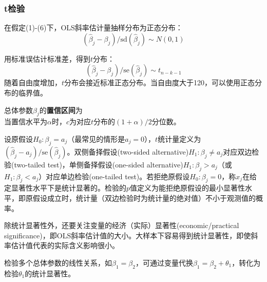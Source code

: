\subsubsection{t检验}
\par 在假定(1)-(6)下，OLS斜率估计量抽样分布为正态分布：
\begin{equation}
    (\hat{\beta}_j-\beta_j)/\text{sd}(\hat{\beta}_j) \sim N(0, 1)
\end{equation}
\par 用标准误估计标准差，得到$t$分布：
\begin{equation}
    (\hat{\beta}_j-\beta_j)/\text{se}(\hat{\beta}_j) \sim t_{n-k-1}
\end{equation}
随着自由度增加，$t$分布会接近标准正态分布。当自由度大于120，可以使用正态分布的临界值。

\par 总体参数$\beta_j$的\textbf{置信区间}为
\begin{equation}
    [\hat{\beta}_j-c\times \text{se}(\hat{\beta}_j),\hat{\beta}_j+c\times\text{se}(\hat{\beta}_j)]
\end{equation}
当置信水平为$\alpha$时，$c$为对应$t$分布的$(1+\alpha)/2$分位数。

\par 设原假设$H_0: \beta_j=a_j$（最常见的情形是$a_j=0$），$t$统计量定义为$(\hat{\beta}_j-a_j)/\text{se}(\hat{\beta}_j)$。双侧备择假设(two-sided alternative)$H_1: \beta_j\neq a_j$对应双边检验(two-tailed test)，单侧备择假设(one-sided alternative)$H_1: \beta_j > a_j$（或$H_1: \beta_j < a_j$）对应单边检验(one-tailed test)。若拒绝原假设$H_0: \beta_j=0$，称$x_j$在给定显著性水平下是统计显著的。检验的$p$值定义为能拒绝原假设的最小显著性水平，即原假设成立时，统计量（双边检验时为统计量的绝对值）不小于观测值的概率。

\par 除统计显著性外，还要关注变量的经济（实际）显著性(economic/practical significance)，即OLS斜率估计值的大小。大样本下容易得到统计显著性，即使斜率估计值代表的实际含义影响很小。
\par 检验多个总体参数的线性关系，如$\beta_1=\beta_2$，可通过变量代换$\beta_1=\beta_2+\theta_1$，转化为检验$\theta_1$的统计显著性。

